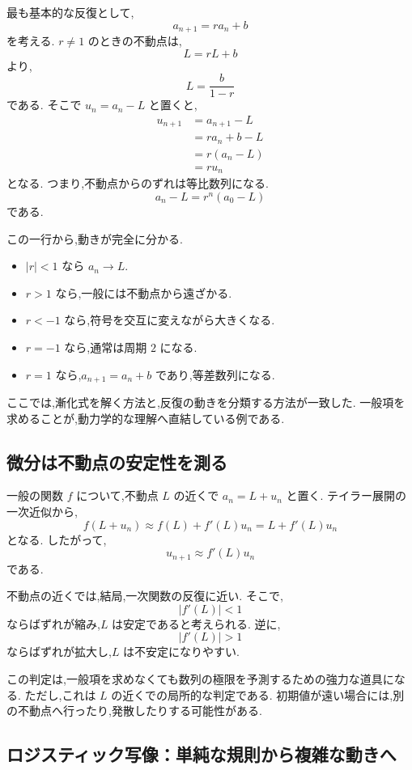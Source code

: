 最も基本的な反復として,
\[
  a_{n+1}=ra_n+b
\]
を考える.
$r\neq1$ のときの不動点は,
\[
  L=rL+b
\]
より,
\[
  L=\frac{b}{1-r}
\]
である.
そこで $u_n=a_n-L$ と置くと,
\[
  \begin{aligned}
    u_{n+1}
     & =a_{n+1}-L \\
     & =ra_n+b-L  \\
     & =r(a_n-L)  \\
     & =ru_n
  \end{aligned}
\]
となる.
つまり,不動点からのずれは等比数列になる.
\[
  a_n-L=r^n(a_0-L)
\]
である.

この一行から,動きが完全に分かる.

\begin{itemize}
  \item $|r|<1$ なら $a_n\to L$.
  \item $r>1$ なら,一般には不動点から遠ざかる.
  \item $r<-1$ なら,符号を交互に変えながら大きくなる.
  \item $r=-1$ なら,通常は周期 $2$ になる.
  \item $r=1$ なら,$a_{n+1}=a_n+b$ であり,等差数列になる.
\end{itemize}

ここでは,漸化式を解く方法と,反復の動きを分類する方法が一致した.
一般項を求めることが,動力学的な理解へ直結している例である.

\subsection{微分は不動点の安定性を測る}

一般の関数 $f$ について,不動点 $L$ の近くで $a_n=L+u_n$ と置く.
テイラー展開の一次近似から,
\[
  f(L+u_n)
  \approx f(L)+f'(L)u_n
  =L+f'(L)u_n
\]
となる.
したがって,
\[
  u_{n+1}\approx f'(L)u_n
\]
である.

不動点の近くでは,結局,一次関数の反復に近い.
そこで,
\[
  |f'(L)|<1
\]
ならばずれが縮み,$L$ は安定であると考えられる.
逆に,
\[
  |f'(L)|>1
\]
ならばずれが拡大し,$L$ は不安定になりやすい.

この判定は,一般項を求めなくても数列の極限を予測するための強力な道具になる.
ただし,これは $L$ の近くでの局所的な判定である.
初期値が遠い場合には,別の不動点へ行ったり,発散したりする可能性がある.

\subsection{ロジスティック写像：単純な規則から複雑な動きへ}

